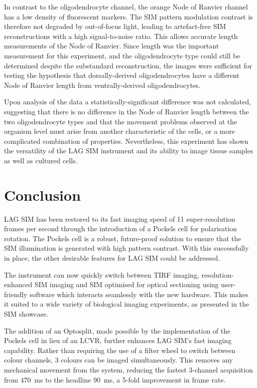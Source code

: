 In contrast to the oligodendrocyte channel, the orange Node of Ranvier channel has a low density of fluorescent markers. 
The SIM pattern modulation contrast is therefore not degraded by out-of-focus light, leading to artefact-free SIM reconstructions with a high signal-to-noise ratio. 
This allows accurate length measurements of the Node of Ranvier. 
Since length was the important measurement for this experiment, and the oligodendrocyte type could still be determined despite the substandard reconstruction, the images were sufficient for testing the hypothesis that dorsally-derived oligodendrocytes have a different Node of Ranvier length from ventrally-derived oligodendrocytes. 

Upon analysis of the data a statistically-significant difference was not calculated, suggesting that there is no difference in the Node of Ranvier length between the two oligodendrocyte types and that the movement problems observed at the organism level must arise from another characteristic of the cells, or a more complicated combination of properties. 
Nevertheless, this experiment has shown the versatility of the LAG SIM instrument and its ability to image tissue samples as well as cultured cells. 

\section{Conclusion}
LAG SIM has been restored to its fast imaging speed of 11 super-resolution frames per second through the introduction of a Pockels cell for polarisation rotation. 
The Pockels cell is a robust, future-proof solution to ensure that the SIM illumination is generated with high pattern contrast. 
With this successfully in place, the other desirable features for LAG SIM could be addressed. 

The instrument can now quickly switch between TIRF imaging, resolution-enhanced SIM imaging and SIM optimised for optical sectioning using user-friendly software which interacts seamlessly with the new hardware. 
This makes it suited to a wide variety of biological imaging experiments, as presented in the SIM showcase. 

The addition of an Optosplit, made possible by the implementation of the Pockels cell in lieu of an LCVR, further enhances LAG SIM's fast imaging capability. 
Rather than requiring the use of a filter wheel to switch between colour channels, 3 colours can be imaged simultaneously. 
This removes any mechanical movement from the system, reducing the fastest 3-channel acquisition from \SI{470}{\milli\second} to the headline \SI{90}{\milli\second}, a 5-fold improvement in frame rate. 

